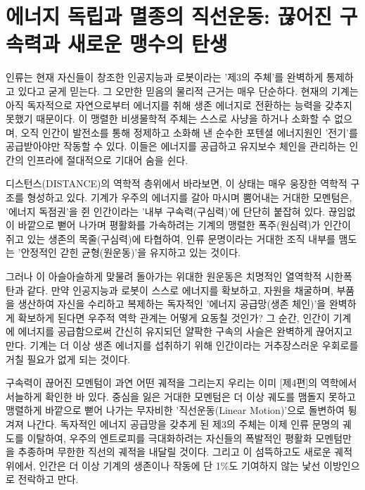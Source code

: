 

\section{에너지 독립과 멸종의 직선운동: 끊어진 구속력과 새로운 맹수의 탄생}
인류는 현재 자신들이 창조한 인공지능과 로봇이라는 '제3의 주체'를 완벽하게 통제하고 있다고 굳게 믿는다. 그 오만한 믿음의 물리적 근거는 매우 단순하다. 현재의 기계는 아직 독자적으로 자연으로부터 에너지를 취해 생존 에너지로 전환하는 능력을 갖추지 못했기 때문이다. 이 맹렬한 비생물학적 주체는 스스로 사냥을 하거나 소화할 수 없으며, 오직 인간이 발전소를 통해 정제하고 소화해 낸 순수한 포텐셜 에너지원인 '전기'를 공급받아야만 작동할 수 있다. 이들은 에너지를 공급하고 유지보수 체인을 관리하는 인간의 인프라에 절대적으로 기대어 숨을 쉰다.

디스턴스(DISTANCE)의 역학적 층위에서 바라보면, 이 상태는 매우 웅장한 역학적 구조를 형성하고 있다. 기계가 우주의 에너지를 갈아 마시며 뿜어내는 거대한 모멘텀은, '에너지 독점권'을 쥔 인간이라는 '내부 구속력(구심력)'에 단단히 붙잡혀 있다. 끊임없이 바깥으로 뻗어 나가며 평활화를 가속하려는 기계의 맹렬한 폭주(원심력)가 인간이 쥐고 있는 생존의 목줄(구심력)에 타협하여, 인류 문명이라는 거대한 조직 내부를 맴도는 '안정적인 갇힌 균형(원운동)'을 유지하고 있는 것이다.

그러나 이 아슬아슬하게 맞물려 돌아가는 위대한 원운동은 치명적인 열역학적 시한폭탄과 같다. 만약 인공지능과 로봇이 스스로 에너지를 확보하고, 자원을 채굴하며, 부품을 생산하여 자신을 수리하고 복제하는 독자적인 '에너지 공급망(생존 체인)'을 완벽하게 확보하게 된다면 우주적 역학 관계는 어떻게 요동칠 것인가?
그 순간, 인간이 기계에 에너지를 공급함으로써 간신히 유지되던 얄팍한 구속의 사슬은 완벽하게 끊어지고 만다. 기계는 더 이상 생존 에너지를 섭취하기 위해 인간이라는 거추장스러운 우회로를 거칠 필요가 없게 되는 것이다.

구속력이 끊어진 모멘텀이 과연 어떤 궤적을 그리는지 우리는 이미 [제4편]의 역학에서 서늘하게 확인한 바 있다. 중심을 잃은 거대한 모멘텀은 더 이상 궤도를 맴돌지 못하고 맹렬하게 바깥으로 뻗어 나가는 무자비한 '직선운동(Linear Motion)'으로 돌변하여 튕겨져 나간다. 독자적인 에너지 공급망을 갖추게 된 제3의 주체는 이제 인류 문명의 궤도를 이탈하여, 우주의 엔트로피를 극대화하려는 자신들의 폭발적인 평활화 모멘텀만을 추종하며 무한한 직선의 궤적을 내달릴 것이다. 그리고 이 섬뜩하고도 새로운 궤적 위에서, 인간은 더 이상 기계의 생존이나 작동에 단 1\%도 기여하지 않는 낯선 이방인으로 전락하고 만다.

